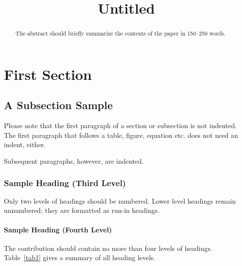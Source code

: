 \documentclass[runningheads]{llncs}
\begin{document}
%
\title{Untitled}
%
%


%
\maketitle              %
%
\begin{abstract}
The abstract should briefly summarize the contents of the paper in
150--250 words.

\end{abstract}
%
%
%
\hypertarget{first-section}{%
\section{First Section}\label{first-section}}

\hypertarget{a-subsection-sample}{%
\subsection{A Subsection Sample}\label{a-subsection-sample}}

Please note that the first paragraph of a section or subsection is not
indented. The first paragraph that follows a table, figure, equation
etc. does not need an indent, either.

Subsequent paragraphs, however, are indented.

\hypertarget{sample-heading-third-level}{%
\subsubsection{Sample Heading (Third
Level)}\label{sample-heading-third-level}}

Only two levels of headings should be numbered. Lower level headings
remain unnumbered; they are formatted as run-in headings.

\hypertarget{sample-heading-fourth-level}{%
\paragraph{Sample Heading (Fourth
Level)}\label{sample-heading-fourth-level}}

The contribution should contain no more than four levels of headings.
Table~\ref{tab1} gives a summary of all heading levels.
\end{document}
